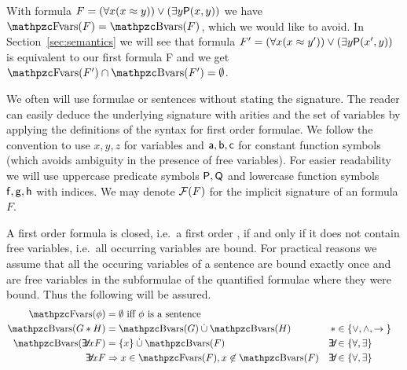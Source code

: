 \begin{example}
	With formula \( F = (\forall x (x\approx y)) \lor (\exists y \mathsf{P}(x,y)) \)
	we have \( \fvar(F) = \bvar(F) \), which we would like to avoid.
	In Section~\vref{sec:semantics} we will see that formula
	\( F' = (\forall x (x\approx y')) \lor (\exists y \mathsf{P}(x',y)) \)
	is equivalent to our first formula F
	and we get
	\( \fvar(F') \cap \bvar(F') = \emptyset \).
\end{example}

We often will use formulae or sentences
without stating the signature.
The reader can easily deduce the underlying  signature with arities
and the set of variables by applying the definitions of the syntax for first order formulae.
We follow the convention to use \( x,y,z \) for variables
and \( \mathsf{a},\mathsf{b},\mathsf{c} \) for constant function symbols
(which avoids ambiguity in the presence of free variables).
For easier readability we will use
uppercase predicate symbols \(\mathsf{P},\mathsf{Q} \) and
lowercase function symbols \( \mathsf{f},\mathsf{g},\mathsf{h} \) with indices.
We may denote \( \mathcal{F}(F) \) for the implicit signature of an formula \( F \).

\begin{definition}\label{def:fof:closed}\label{def:fof:sentence}
	A first order formula is closed, i.e.~a first order ,
	if and only if it does not contain free variables, 
	i.e.~all occurring variables are bound.
	For practical reasons we assume that all the occuring variables of a sentence
	are bound exactly once
	and are free variables
	in the subformulae of the quantified formulae where they were bound.
	Thus the following will be assured.
	\begin{align*}
		\fvar(\phi) &= \emptyset
		\text{ iff }\phi\text{ is a sentence}
		\\
		\bvar(G \connect H) &= \bvar(G)\disjointunion\bvar(H)
		&\connect& \in \SetOfConnectives
		\\
		\bvar(\quantify x F) &= \{x\}\disjointunion\bvar(F)
		&\quantify& \in \SetOfQuantifiers
		\\
		\quantify x F &\Rightarrow
		x\in\fvar(F), x\not\in\bvar(F)
		&\quantify& \in \SetOfQuantifiers
	\end{align*}
\end{definition}

